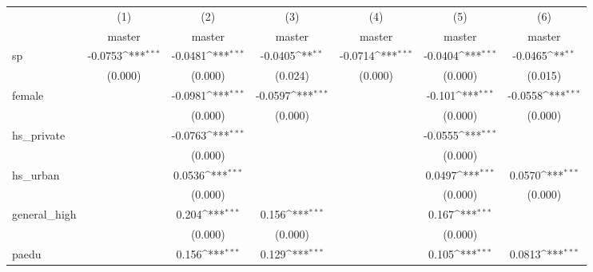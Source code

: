 {
\def\sym#1{\ifmmode^{#1}\else\(^{#1}\)\fi}
\begin{tabular}{l*{6}{c}}
\hline\hline
            &\multicolumn{1}{c}{(1)}&\multicolumn{1}{c}{(2)}&\multicolumn{1}{c}{(3)}&\multicolumn{1}{c}{(4)}&\multicolumn{1}{c}{(5)}&\multicolumn{1}{c}{(6)}\\
            &\multicolumn{1}{c}{master}&\multicolumn{1}{c}{master}&\multicolumn{1}{c}{master}&\multicolumn{1}{c}{master}&\multicolumn{1}{c}{master}&\multicolumn{1}{c}{master}\\
\hline
sp          &     -0.0753\sym{***}&     -0.0481\sym{***}&     -0.0405\sym{**} &     -0.0714\sym{***}&     -0.0404\sym{***}&     -0.0465\sym{**} \\
            &     (0.000)         &     (0.000)         &     (0.024)         &     (0.000)         &     (0.000)         &     (0.015)         \\
[1em]
female      &                     &     -0.0981\sym{***}&     -0.0597\sym{***}&                     &      -0.101\sym{***}&     -0.0558\sym{***}\\
            &                     &     (0.000)         &     (0.000)         &                     &     (0.000)         &     (0.000)         \\
[1em]
hs\_private  &                     &     -0.0763\sym{***}&                     &                     &     -0.0555\sym{***}&                     \\
            &                     &     (0.000)         &                     &                     &     (0.000)         &                     \\
[1em]
hs\_urban    &                     &      0.0536\sym{***}&                     &                     &      0.0497\sym{***}&      0.0570\sym{***}\\
            &                     &     (0.000)         &                     &                     &     (0.000)         &     (0.000)         \\
[1em]
general\_high&                     &       0.204\sym{***}&       0.156\sym{***}&                     &       0.167\sym{***}&                     \\
            &                     &     (0.000)         &     (0.000)         &                     &     (0.000)         &                     \\
[1em]
paedu       &                     &       0.156\sym{***}&       0.129\sym{***}&                     &       0.105\sym{***}&      0.0813\sym{***}\\

\end{tabular}}
